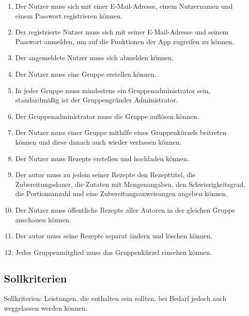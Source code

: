 \documentclass[parskip=full]{scrartcl}
\begin{document}
\begin{enumerate}[start=1,label={$\langle$\bfseries RM\arabic*$\rangle$}, leftmargin = 5em, itemsep=4pt, parsep=4pt]
    \item Der Nutzer muss sich mit einer E-Mail-Adresse, einem Nutzernamen und einem Passwort registrieren können.\label{rm:Registering}
    \item Der registrierte Nutzer muss sich mit seiner E-Mail-Adresse und seinem Passwort anmelden, um auf die Funktionen der App zugreifen zu können. \label{rm:Login}
    \item Der angemeldete Nutzer muss sich abmelden können. \label{rm:Logout}
    \item Der Nutzer muss eine Gruppe erstellen können. \label{rm:GroupCreation}
    \item In jeder Gruppe muss mindestens ein Gruppenadministrator sein, standardmäßig ist der Gruppengründer Administrator.\label{rm:GroupAdmin}
    \item Der Gruppenadministrator muss die Gruppe auflösen können. \label{rm:GroupDeletion}
    \item Der Nutzer muss einer Gruppe mithilfe eines Gruppenkürzels beitreten können und diese danach auch wieder verlassen können.\label{rm:GroupJoining}
    \item Der Nutzer muss Rezepte erstellen und hochladen können. \label{rm:RecipeCreation}
    \item Der \Gls{autor} muss zu jedem seiner Rezepte den Rezepttitel, die Zubereitungsdauer, die Zutaten mit Mengenangaben, den Schwierigkeitsgrad, die Portionsanzahl und eine Zubereitungsanweisungen angeben können.\label{rm:RecipeContents}
    \item Der Nutzer muss öffentliche Rezepte aller Autoren in der gleichen Gruppe anschauen können.\label{rm:RecipeViewing}
    \item Der \Gls{autor} muss seine Rezepte separat ändern und löschen können.\label{rm:RecipeManagement}
    \item Jedes Gruppenmitglied muss das Gruppenkürzel einsehen können.\label{rm:GroupId}
\end{enumerate}

\subsection{Sollkriterien}
Sollkriterien: Leistungen, die enthalten sein sollten, bei Bedarf jedoch auch weggelassen werden können.
\end{document}
